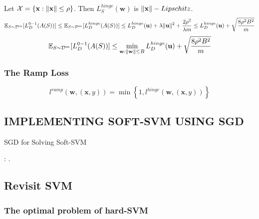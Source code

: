 \begin{corollary}
    Let $ \mathcal{X} = \left\{ \mathbf{x} : \Arrowvert \mathbf{x} \Arrowvert \le \rho \right\} $. Then $ L^{hinge}_S( \mathbf{w}) $ is $ \Arrowvert \mathbf{x} \Arrowvert -Lipschitz $.
    \[
        \mathbb{E}_{S \sim \mathcal{D}^m} [L^{0-1}_D( A(S) ) ] \le
        \mathbb{E}_{S \sim \mathcal{D}^m} [L^{hinge}_D( A(S) ) ]
        \le L^{hinge}_D( \mathbf{u}) + \lambda \Arrowvert \mathbf{u} \Arrowvert^2 + \frac{2 \rho^2}{ \lambda m} 
        \le L^{hinge}_D( \mathbf{u}) + \sqrt{ \frac{8 \rho^2 B^2}{m} }
    \]
    \[
        \mathbb{E}_{S \sim \mathcal{D}^m} [L^{0-1}_D( A(S) ) ]
        \le \min_{ \mathbf{w}: \Arrowvert \mathbf{w} \Arrowvert \le B}L^{hinge}_D( \mathbf{u}) + \sqrt{ \frac{8 \rho^2 B^2}{m} }
    \]
\end{corollary}

\subsubsection{The Ramp Loss}%
\[
    l^{ramp} ( \textbf{w}, ( \textbf{x}, y))
    = \min \left\{ 1, l^{hinge} ( \mathbf{w}, ( \mathbf{x}, y)) \right\}
\]

\subsection{IMPLEMENTING SOFT-SVM USING SGD}%
\label{sub:implementing_soft_svm_using_sgd}

\begin{algorithm}[h!]
    \caption{SGD for Solving Soft-SVM} 
    \begin{algorithmic}
            :
        \EndFor.
    \end{algorithmic}
\end{algorithm}

\subsection{Revisit SVM}

\subsubsection{The optimal problem of hard-SVM}


